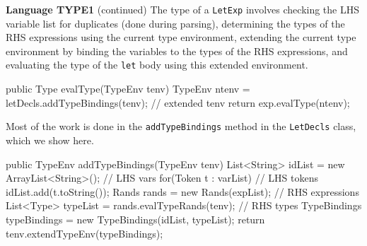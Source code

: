 \begin{minipage}[t]{\sw}
\slidenumber
\LARGE
{\bf Language TYPE1} (continued)\exx
The type of a \verb'LetExp' involves checking
the LHS variable list for duplicates
(done during parsing),
determining the types of the RHS expressions
using the current type environment,
extending the current type environment
by binding the variables to the types of the RHS expressions,
and evaluating the type of the \verb'let' body
using this extended environment.
{\Large
\begin{qv}
public Type evalType(TypeEnv tenv) {
    TypeEnv ntenv = letDecls.addTypeBindings(tenv); // extended tenv
    return exp.evalType(ntenv);
}
\end{qv}
}
Most of the work is done in the \verb'addTypeBindings' method
in the \verb'LetDecls' class,
which we show here.
{\Large
\begin{qv}
public TypeEnv addTypeBindings(TypeEnv tenv) {
    List<String> idList = new ArrayList<String>(); // LHS vars
    for(Token t : varList) // LHS tokens
        idList.add(t.toString());
    Rands rands = new Rands(expList);  // RHS expressions
    List<Type> typeList = rands.evalTypeRands(tenv); // RHS types
    TypeBindings typeBindings = new TypeBindings(idList, typeList);
    return tenv.extendTypeEnv(typeBindings);
}
\end{qv}
}
\end{minipage}
